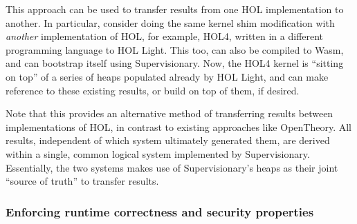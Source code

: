 \documentclass[a4paper, UKenglish, cleveref, autoref, thm-restate]{lipics-v2021}
\begin{document}
This approach can be used to transfer results from one HOL implementation to another.  In particular, consider doing the same kernel shim modification with \emph{another} implementation of HOL, for example, HOL4, written in a different programming language to HOL Light.
This too, can also be compiled to Wasm, and can bootstrap itself using Supervisionary.
Now, the HOL4 kernel is ``sitting on top'' of a series of heaps populated already by HOL Light, and can make reference to these existing results, or build on top of them, if desired.

Note that this provides an alternative method of transferring results between implementations of HOL, in contrast to existing approaches like OpenTheory.
All results, independent of which system ultimately generated them, are derived within a single, common logical system implemented by Supervisionary.
Essentially, the two systems makes use of Supervisionary's heaps as their joint ``source of truth'' to transfer results.

\subsubsection*{Enforcing runtime correctness and security properties}
\end{document}
